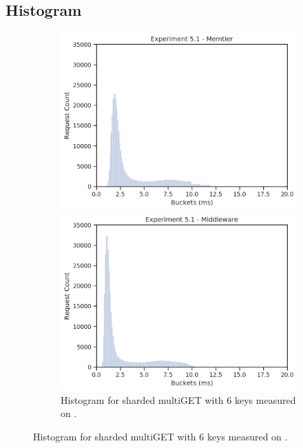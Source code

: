     \subsection{Histogram\label{subsec:5_histograms}}

        \begin{figure}
            \vspace*{-.5\baselineskip}
                \centering
            \begin{subfigure}[t!]{0.48\textwidth}
                \centering
                \includegraphics[width=\textwidth]{../data_analysis/figures/5-1_mt_histogram.png}
                \caption{Histogram for sharded multiGET with 6 keys measured on \cli.\label{fig:histogram_sharded_mt}}
                \includegraphics[width=\textwidth]{../data_analysis/figures/5-1_mw_histogram.png}

\end{subfigure}
\end{figure}

